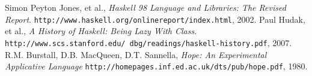 \documentclass[12pt]{article}
\begin{document}
\begin{thebibliography}{99}
  Simon Peyton Jones, et al.,
  \emph{Haskell 98 Language and Libraries: The Revised Report}.
  \texttt{http://www.haskell.org/onlinereport/index.html},
  2002.
  Paul Hudak, et al.,
  \emph{A History of Haskell: Being Lazy With Class}.
  \texttt{http://www.scs.stanford.edu/~dbg/readings/haskell-history.pdf},
  2007.
  R.M. Burstall, D.B. MacQueen, D.T. Sannella,
  \emph{Hope: An Experimental Applicative Language}
  \texttt{http://homepages.inf.ed.ac.uk/dts/pub/hope.pdf},
  1980.
\end{thebibliography}
\end{document}

